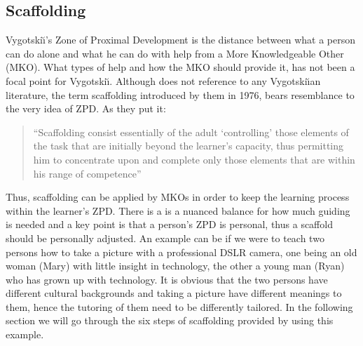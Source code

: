 \subsection{Scaffolding}
Vygotski{\u\i}'s Zone of Proximal Development is the distance between what a person can do alone and what he can do with help from a More Knowledgeable Other (MKO). What types of help and how the MKO should provide it, has not been a focal point for Vygotski{\u\i}. Although \citeauthor*{wood1976role} does not reference to any Vygotski{\u\i}an literature, the term scaffolding introduced by them in 1976, bears resemblance to the very idea of ZPD. As they put it:

\begin{quote}“Scaffolding consist essentially of the adult ‘controlling’ those elements of the task that are initially beyond the learner’s capacity, thus permitting him to concentrate upon and complete only those elements that are within his range of competence” \citep{wood1976role}
\end{quote}

Thus, scaffolding can be applied by MKOs in order to keep the learning process within the learner’s ZPD. There is a is a nuanced balance for how much guiding is needed and a key point is that a person's ZPD is personal, thus a scaffold should be personally adjusted. An example can be if we were to teach two persons how to take a picture with a professional DSLR camera, one being an old woman (Mary) with little insight in technology, the other a young man (Ryan) who has grown up with technology. It is obvious that the two persons have different cultural backgrounds and taking a picture have different meanings to them, hence the tutoring of them need to be differently tailored. In the following section we will go through the six steps of scaffolding provided by \citet{wood1976role} using this example.

